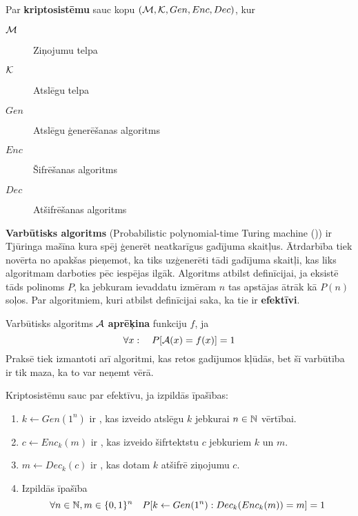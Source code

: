 Par \textbf{kriptosistēmu} sauc kopu $(\mathcal{M}, \mathcal{K}, Gen, Enc, Dec)$, kur
\begin{description}
    \item[$\mathcal{M}$]Ziņojumu telpa
    \item[$\mathcal{K}$]Atslēgu telpa
    \item[$Gen$]Atslēgu ģenerēšanas algoritms
    \item[$Enc$]Šifrēšanas algoritms
    \item[$Dec$]Atšifrēšanas algoritms
\end{description}

\textbf{Varbūtisks algoritms} (Probabilistic polynomial-time Turing machine \mbox{(\ppt))} ir Tjūringa mašīna kura spēj ģenerēt neatkarīgus gadījuma skaitļus. Ātrdarbība tiek novērta no apakšas pieņemot, ka tiks uzģenerēti tādi gadījuma skaitļi, kas liks algoritmam darboties pēc iespējas ilgāk. Algoritms atbilst definīcijai, ja eksistē tāds polinoms $P$, ka jebkuram ievaddatu izmēram $n$ tas apstājas ātrāk kā $P(n)$ soļos. Par algoritmiem, kuri atbilst definīcijai saka, ka tie ir \textbf{efektīvi}.

Varbūtisks algoritms $\mathcal{A}$ \textbf{aprēķina} funkciju $f$, ja
$$ \forall x : \quad P[\mathcal{A}(x) = f(x)] = 1 $$
Praksē tiek izmantoti arī algoritmi, kas retos gadījumos kļūdās, bet šī varbūtība ir tik maza, ka to var neņemt vērā.

Kriptosistēmu sauc par efektīvu, ja izpildās īpašības:
\begin{enumerate}
    \item $k \leftarrow Gen(1^n)$ ir \ppt, kas izveido atslēgu $k$ jebkurai $n\in\mathbb{N}$ vērtībai.
    \item $c \leftarrow Enc_k(m)$ ir \ppt, kas izveido šifrtektstu $c$ jebkuriem $k$ un $m$.
    \item $m \leftarrow Dec_k(c)$ ir \ppt, kas dotam $k$ atšifrē ziņojumu $c$.
    \item Izpildās īpašība
        $$ \forall n\in\mathbb{N}, m\in\{0,1\}^n \quad P[k\leftarrow Gen(1^n): Dec_k(Enc_k(m)) = m] = 1 $$
\end{enumerate}

